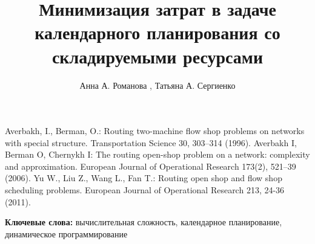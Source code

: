 \begin{thebibliography}{1}
\providecommand{\url}[1]{\texttt{#1}}
\providecommand{\urlprefix}{URL }

Averbakh, I., Berman, O.:  Routing two-machine flow shop problems on networks with special structure. Transportation Science 30, 303--314 (1996).
Averbakh I, Berman O, Chernykh I: The routing open-shop problem on a network: complexity and approximation. European Journal of Operational Research 173(2), 521--39 (2006).
Yu W., Liu Z., Wang L., Fan T.: Routing open shop and flow shop scheduling problems. European Journal of Operational Research 213, 24-36 (2011).


\end{thebibliography}
%
%
\title{Минимизация затрат  в задаче календарного планирования со
складируемыми ресурсами }
%
%
\author{Анна А. Романова , Татьяна А. Сергиенко }
%
%
%

\maketitle              %

\textbf{Ключевые слова:} вычислительная сложность, календарное
планирование, динамическое программирование \\

